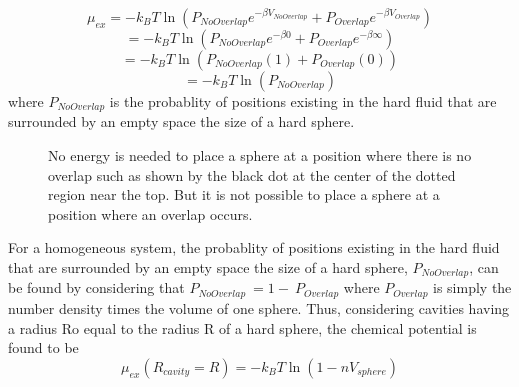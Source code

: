 \documentclass[12pt]{article}
\begin{document}
\begin{equation}\mu_{ex}=-k_BT\ln\left(P_{NoOverlap}e^{-\beta{V}_{NoOverlap}}+P_{Overlap}e^{-\beta{V}_{Overlap}}\right)\end{equation}
\begin{equation}=-k_BT\ln\left(P_{NoOverlap}e^{-\beta{0}}+P_{Overlap}e^{-\beta\infty}\right)\end{equation}
\begin{equation}=-k_BT\ln\left(P_{NoOverlap}(1)+P_{Overlap}(0)\right)\end{equation}
\begin{equation}=-k_BT\ln\left(P_{NoOverlap}\right)\end{equation}
where $P_{NoOverlap}$ is the probablity of positions existing in the hard fluid that are surrounded by an empty space the size of a hard sphere.

\begin{figure}[h!]
    \centering
    \caption{No energy is needed to place a sphere at a position where there is no overlap such 
             as shown by the black dot at the center of the dotted region near the top. 
             But it is not possible to place a sphere at a position where an overlap occurs.}
    \label{fig:p_overlap}
  \end{figure}

For a homogeneous system, the probablity of positions existing in the hard fluid that are surrounded 
by an empty space the size of a hard sphere, $P_{NoOverlap}$, can be found by considering 
that $P_{NoOverlap}~=1-~P_{Overlap}$ where $P_{Overlap}$ is simply the number density times the volume of one sphere. 
\color{red}Thus, considering cavities having a radius Ro equal to the radius R of a hard sphere, the chemical potential is found to be \color{black}
\begin{equation}\label{mu_excess}\mu_{ex}(R_{cavity}=R)=-k_BT\ln\left(1-nV_{sphere}\right)\end{equation}

\end{document}
